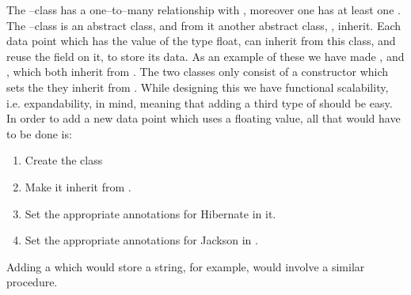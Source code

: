 The --class has a one--to--many relationship with , moreover one  has at least one . 
The --class is an abstract class, and from it another abstract class, , inherit. 
Each data point which has the value of the type float, can inherit from this class, and reuse the  field on it, to store its data.
As an example of these we have made , and , which both inherit from . 
The two classes only consist of a constructor which sets the  they inherit from .
While designing this we have functional scalability, i.e. expandability, in mind, meaning that adding a third type of  should be easy. 
In order to add a new data point which uses a floating value, all that would have to be done is: 
\begin{enumerate}
    \item Create the class 
    \item Make it inherit from .
    \item Set the appropriate annotations for Hibernate in it.
    \item Set the appropriate annotations for Jackson in .
\end{enumerate}

Adding a  which would store a string, for example, would involve a similar procedure.
